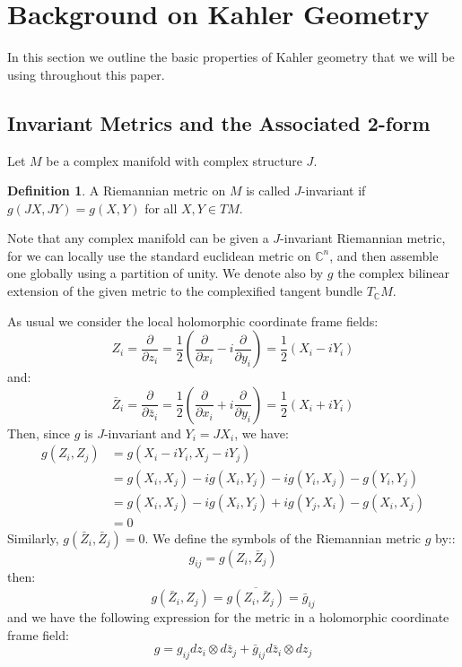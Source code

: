 \documentclass[11pt]{amsart}
\theoremstyle{definition}
\newtheorem{definition}[subsection]{Definition}
\def \C{ \mathbb{C} }
\def \del{ \partial }
\begin{document}
\parskip 6pt
\parindent 0pt
\baselineskip 14pt

\section{ Background on Kahler Geometry }

In this section we outline the basic properties of Kahler geometry that we will be using throughout this paper.

\subsection{Invariant Metrics and the Associated 2-form }

Let $M$ be a complex manifold with complex structure $J$.
%
\begin{definition} A Riemannian metric on $M$ is called $J$-invariant if $g(JX, JY) = g(X, Y)$ for all $X,Y \in TM$.
\end{definition}
%
Note that any complex manifold can be given a $J$-invariant Riemannian metric, for we can locally use the standard euclidean metric on $\C^n$, and then assemble one globally using a partition of unity.  
%
We denote also by $g$ the complex bilinear extension of the given metric to the complexified tangent bundle $T_{\C}M$.  

As usual we consider the local holomorphic coordinate frame fields:
%
$$ Z_i = \frac{ \del }{ \del z_i } = \frac{1}{2} \left( \frac{ \del }{ \del x_i } - i \frac{ \del }{ \del y_i } \right) = \frac{1}{2}(X_i - i Y_i) $$
%
and:
%
$$\bar{Z}_i = \frac{ \del }{ \del \bar{z}_i } = \frac{1}{2} \left( \frac{ \del }{ \del x_i } + i \frac{ \del }{ \del y_i } \right) = \frac{1}{2} ( X_i + i Y_i ) $$
%
Then, since  $g$ is $J$-invariant and $Y_i = J X_i$, we have:
%
\begin{align*}
g(Z_i, Z_j) &= g( X_i - i Y_i, X_j - i Y_j ) \\
&= g( X_i, X_j ) - i g(X_i, Y_j) - i g(Y_i, X_j) - g(Y_i, Y_j) \\
&= g( X_i, X_j ) - i g(X_i, Y_j) + i g(Y_j, X_i) - g(X_i, X_j) \\
&= 0
\end{align*}
%
Similarly, $g( \bar{Z}_i, \bar{Z}_j ) = 0$.  
%
We define the symbols of the Riemannian metric $g$ by::
%
$$ g_{ij} = g( Z_i, \bar{Z}_j ) $$
%
then:
%
$$ g( \bar{Z}_i, Z_j ) = \overline{ g( Z_i, \bar{Z}_j ) } = \bar{g}_{ij} $$
%
and we have the following expression for the metric in a holomorphic coordinate frame field:
%
$$ g = g_{ij} d z_i \otimes d \bar{z}_j + \bar{g}_{ij} d \bar{z}_i \otimes d z_j $$
\end{document}
